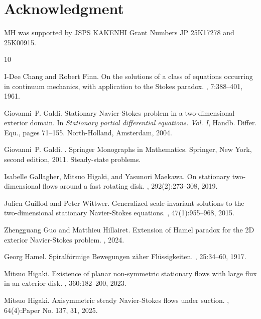 \documentclass[11pt,a4paper]{article}
\numberwithin{equation}{section}
\begin{document}
\section*{Acknowledgment}


MH was supported by JSPS KAKENHI Grant Numbers JP 25K17278 and 25K00915. 


\begin{thebibliography}{10}

I-Dee Chang and Robert Finn.
\newblock On the solutions of a class of equations occurring in continuum
  mechanics, with application to the {S}tokes paradox.
, 7:388--401, 1961.

Giovanni~P. Galdi.
\newblock Stationary {N}avier-{S}tokes problem in a two-dimensional exterior
  domain.
\newblock In {\em Stationary partial differential equations. {V}ol. {I}},
  Handb. Differ. Equ., pages 71--155. North-Holland, Amsterdam, 2004.

Giovanni~P. Galdi.
.
\newblock Springer Monographs in Mathematics. Springer, New York, second
  edition, 2011.
\newblock Steady-state problems.

Isabelle Gallagher, Mitsuo Higaki, and Yasunori Maekawa.
\newblock On stationary two-dimensional flows around a fast rotating disk.
, 292(2):273--308, 2019.

Julien Guillod and Peter Wittwer.
\newblock Generalized scale-invariant solutions to the two-dimensional
  stationary {N}avier-{S}tokes equations.
, 47(1):955--968, 2015.

Zhengguang Guo and Matthieu Hillairet.
\newblock Extension of {H}amel paradox for the 2{D} exterior {N}avier-{S}tokes
  problem.
, 2024.

Georg Hamel.
\newblock Spiralförmige {B}ewegungen zäher {F}lüssigkeiten.
,
  25:34--60, 1917.

Mitsuo Higaki.
\newblock Existence of planar non-symmetric stationary flows with large flux in
  an exterior disk.
, 360:182--200, 2023.

Mitsuo Higaki.
\newblock Axisymmetric steady {N}avier-{S}tokes flows under suction.
, 64(4):Paper No. 137,
  31, 2025.


\end{thebibliography}
\end{document}
